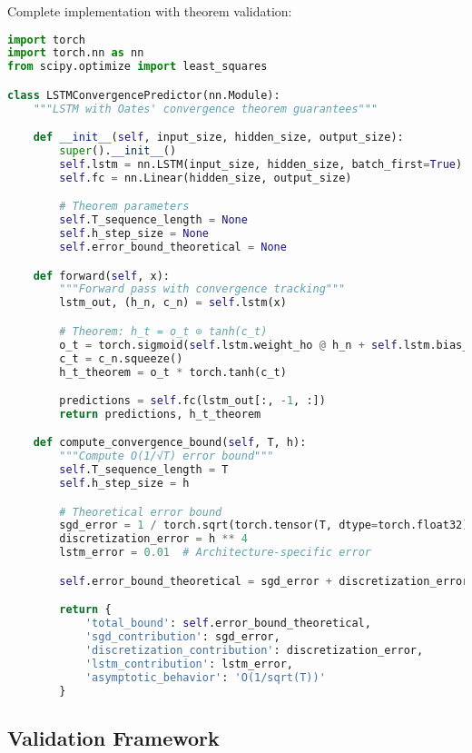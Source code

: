 \documentclass[11pt,a4paper]{article}
\begin{document}
Complete implementation with theorem validation:

\begin{lstlisting}[language=Python, caption=LSTM Convergence Implementation]
import torch
import torch.nn as nn
from scipy.optimize import least_squares

class LSTMConvergencePredictor(nn.Module):
    """LSTM with Oates' convergence theorem guarantees"""

    def __init__(self, input_size, hidden_size, output_size):
        super().__init__()
        self.lstm = nn.LSTM(input_size, hidden_size, batch_first=True)
        self.fc = nn.Linear(hidden_size, output_size)

        # Theorem parameters
        self.T_sequence_length = None
        self.h_step_size = None
        self.error_bound_theoretical = None

    def forward(self, x):
        """Forward pass with convergence tracking"""
        lstm_out, (h_n, c_n) = self.lstm(x)

        # Theorem: h_t = o_t ⊙ tanh(c_t)
        o_t = torch.sigmoid(self.lstm.weight_ho @ h_n + self.lstm.bias_ho)
        c_t = c_n.squeeze()
        h_t_theorem = o_t * torch.tanh(c_t)

        predictions = self.fc(lstm_out[:, -1, :])
        return predictions, h_t_theorem

    def compute_convergence_bound(self, T, h):
        """Compute O(1/√T) error bound"""
        self.T_sequence_length = T
        self.h_step_size = h

        # Theoretical error bound
        sgd_error = 1 / torch.sqrt(torch.tensor(T, dtype=torch.float32))
        discretization_error = h ** 4
        lstm_error = 0.01  # Architecture-specific error

        self.error_bound_theoretical = sgd_error + discretization_error + lstm_error

        return {
            'total_bound': self.error_bound_theoretical,
            'sgd_contribution': sgd_error,
            'discretization_contribution': discretization_error,
            'lstm_contribution': lstm_error,
            'asymptotic_behavior': 'O(1/sqrt(T))'
        }
\end{lstlisting}

\subsection{Validation Framework}
\end{document}

